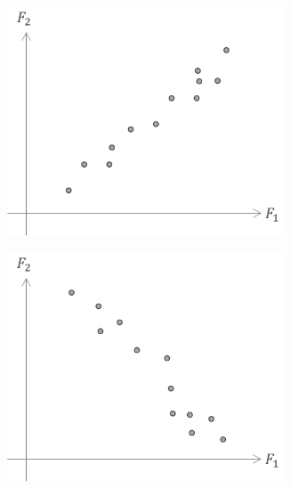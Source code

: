 \begin{figure}[H]
  \begin{subfigure}{0.3\textwidth}
    \centering
    \includegraphics[width=0.9\textwidth]{assets/visualization_and_extraction/feature_relation/scatter_pos_cor.png}
  \end{subfigure}\hspace*{0.025\textwidth}
  \begin{subfigure}{0.3\textwidth}
    \centering
    \includegraphics[width=0.9\textwidth]{assets/visualization_and_extraction/feature_relation/scatter_neg_cor.png}
  \end{subfigure}\hspace*{0.025\textwidth}

\end{figure}
